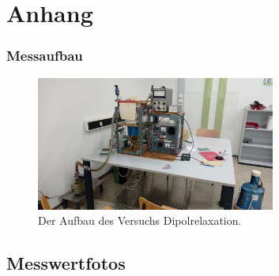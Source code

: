 \newpage
\section{Anhang}


\subsubsection{Messaufbau}



\begin{figure}[h]
    \centering
    \includegraphics[width=0.7\textwidth]{latex/images/Aufbau.jpeg}
    \caption{Der Aufbau des Versuchs Dipolrelaxation.}
\end{figure}
%


\subsection{Messwertfotos}

